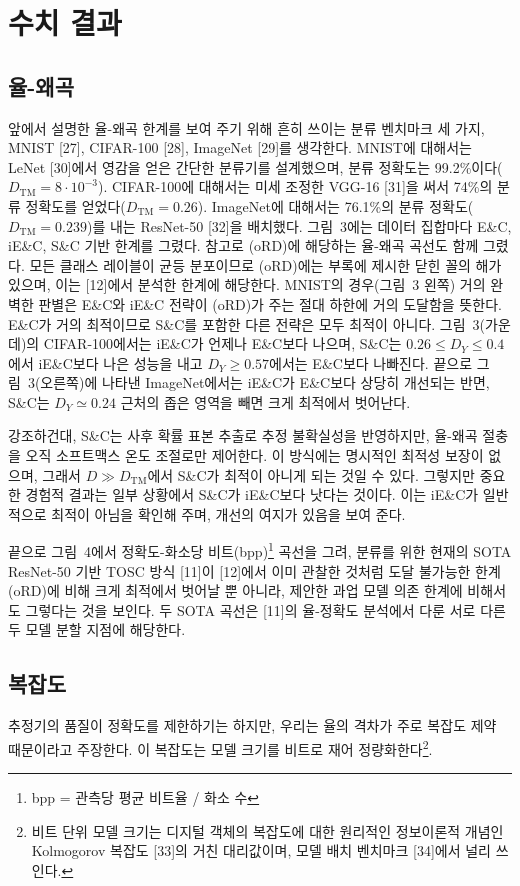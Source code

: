 \section{수치 결과}
\subsection{율-왜곡}
앞에서 설명한 율-왜곡 한계를 보여 주기 위해 흔히 쓰이는 분류 벤치마크 세 가지, MNIST [27], CIFAR-100 [28], ImageNet [29]를 생각한다. MNIST에 대해서는 LeNet [30]에서 영감을 얻은 간단한 분류기를 설계했으며, 분류 정확도는 99.2\%이다($D_{\mathrm{TM}}=8\cdot10^{-3}$). CIFAR-100에 대해서는 미세 조정한 VGG-16 [31]을 써서 74\%의 분류 정확도를 얻었다($D_{\mathrm{TM}}=0.26$). ImageNet에 대해서는 76.1\%의 분류 정확도($D_{\mathrm{TM}}=0.239$)를 내는 ResNet-50 [32]을 배치했다. 그림~3에는 데이터 집합마다 E\&C, iE\&C, S\&C 기반 한계를 그렸다. 참고로 (oRD)에 해당하는 율-왜곡 곡선도 함께 그렸다. 모든 클래스 레이블이 균등 분포이므로 (oRD)에는 부록에 제시한 닫힌 꼴의 해가 있으며, 이는 [12]에서 분석한 한계에 해당한다. MNIST의 경우(그림~3 왼쪽) 거의 완벽한 판별은 E\&C와 iE\&C 전략이 (oRD)가 주는 절대 하한에 거의 도달함을 뜻한다. E\&C가 거의 최적이므로 S\&C를 포함한 다른 전략은 모두 최적이 아니다. 그림~3(가운데)의 CIFAR-100에서는 iE\&C가 언제나 E\&C보다 나으며, S\&C는 $0.26\le D_Y\le0.4$에서 iE\&C보다 나은 성능을 내고 $D_Y\ge0.57$에서는 E\&C보다 나빠진다. 끝으로 그림~3(오른쪽)에 나타낸 ImageNet에서는 iE\&C가 E\&C보다 상당히 개선되는 반면, S\&C는 $D_Y\simeq0.24$ 근처의 좁은 영역을 빼면 크게 최적에서 벗어난다.

강조하건대, S\&C는 사후 확률 표본 추출로 추정 불확실성을 반영하지만, 율-왜곡 절충을 오직 소프트맥스 온도 조절로만 제어한다. 이 방식에는 명시적인 최적성 보장이 없으며, 그래서 $D\gg D_{\mathrm{TM}}$에서 S\&C가 최적이 아니게 되는 것일 수 있다. 그렇지만 중요한 경험적 결과는 일부 상황에서 S\&C가 iE\&C보다 낫다는 것이다. 이는 iE\&C가 일반적으로 최적이 아님을 확인해 주며, 개선의 여지가 있음을 보여 준다.

끝으로 그림~4에서 정확도-화소당 비트(bpp)\footnote{bpp = 관측당 평균 비트율 / 화소 수} 곡선을 그려, 분류를 위한 현재의 SOTA ResNet-50 기반 TOSC 방식 [11]이 [12]에서 이미 관찰한 것처럼 도달 불가능한 한계 (oRD)에 비해 크게 최적에서 벗어날 뿐 아니라, 제안한 과업 모델 의존 한계에 비해서도 그렇다는 것을 보인다. 두 SOTA 곡선은 [11]의 율-정확도 분석에서 다룬 서로 다른 두 모델 분할 지점에 해당한다.

\subsection{복잡도}
추정기의 품질이 정확도를 제한하기는 하지만, 우리는 율의 격차가 주로 복잡도 제약 때문이라고 주장한다. 이 복잡도는 모델 크기를 비트로 재어 정량화한다\footnote{비트 단위 모델 크기는 디지털 객체의 복잡도에 대한 원리적인 정보이론적 개념인 Kolmogorov 복잡도 [33]의 거친 대리값이며, 모델 배치 벤치마크 [34]에서 널리 쓰인다.}.

